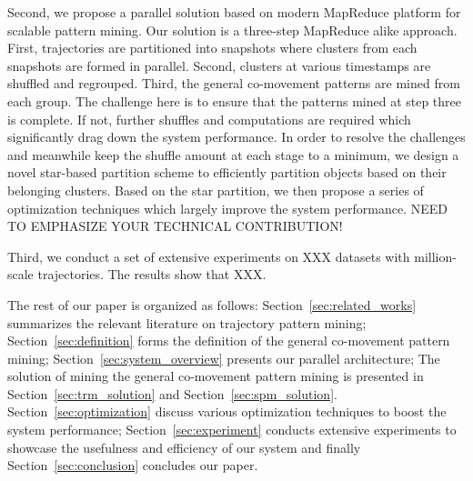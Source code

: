 Second, we propose a parallel solution based on modern MapReduce platform for scalable pattern mining. Our
solution is a three-step MapReduce alike approach. First, trajectories are partitioned
into snapshots where clusters from each snapshots are formed in parallel. Second, 
clusters at various timestamps are shuffled and regrouped. Third, the general co-movement patterns
are mined from each group. The challenge here is to ensure that
the patterns mined at step three is complete. If not, further shuffles and computations are required which 
significantly drag down the system performance. In order to resolve the challenges and meanwhile keep the 
shuffle amount at each stage to a minimum, 
we design a novel star-based partition scheme to efficiently partition objects based on their
belonging clusters. Based on the star partition, we then propose a series of optimization techniques which
largely improve the system performance. NEED TO EMPHASIZE YOUR TECHNICAL CONTRIBUTION!

Third, we conduct a set of extensive experiments on XXX datasets with million-scale trajectories. The results show that XXX.

The rest of our paper is organized as follows: Section~\ref{sec:related_works} summarizes the relevant literature on 
trajectory pattern mining; Section~\ref{sec:definition} forms the definition of the general co-movement pattern mining; Section~\ref{sec:system_overview} presents our parallel architecture; The solution of mining the general co-movement pattern mining is presented in Section~\ref{sec:trm_solution} and Section~\ref{sec:spm_solution}. Section~\ref{sec:optimization} discuss various optimization techniques to boost the system performance; Section~\ref{sec:experiment} conducts extensive experiments to showcase the usefulness and efficiency of our system and finally Section~\ref{sec:conclusion} concludes our paper.

